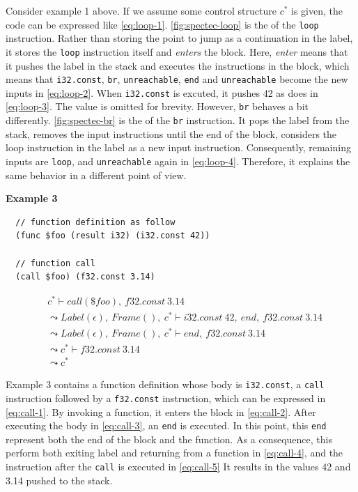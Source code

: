 Consider example 1 above.
If we assume some control structure $c^*$ is given, the code can be expressed
like \cref{eq:loop-1}.
\cref{fig:spectec-loop} is the \spectecp{} of the \texttt{loop} instruction.
Rather than storing the point to jump as a continuation in the label, it stores
the \texttt{loop} instruction itself and \textit{enters} the block.
Here, \textit{enter} means that it pushes the label in the stack and executes
the instructions in the block, which means that \texttt{i32.const},
\texttt{br}, \texttt{unreachable}, \texttt{end} and \texttt{unreachable} become
the new inputs in \cref{eq:loop-2}.
When \texttt{i32.const} is excuted, it pushes 42 as \officialp{} does
in \cref{eq:loop-3}.
The value is omitted for brevity.
However, \texttt{br} behaves a bit differently.
\cref{fig:spectec-br} is the \spectecp{} of the \texttt{br} instruction.
It pops the label from the stack, removes the input instructions until the end
of the block, considers the loop instruction in the label as a new input
instruction.
Consequently, remaining inputs are \texttt{loop}, and \texttt{unreachable}
again in \cref{eq:loop-4}.
Therefore, it explains the same behavior in a different point of view.


\textbf{Example 3}
\begin{verbatim}
  // function definition as follow
  (func $foo (result i32) (i32.const 42))

  // function call
  (call $foo) (f32.const 3.14)
\end{verbatim}

\begin{align}
  &c^* \vdash call(\$foo), ~ f32.const ~ 3.14 \label{eq:call-1} \\
&\leadsto
  Label(\epsilon), ~ Frame(), ~ c^* \vdash i32.const ~ 42, ~ end, ~ f32.const ~ 3.14 \label{eq:call-2} \\
&\leadsto
  Label(\epsilon), ~ Frame(), ~ c^* \vdash end, ~ f32.const ~ 3.14 \label{eq:call-3} \\
&\leadsto
  c^* \vdash f32.const ~ 3.14 \label{eq:call-4} \\
&\leadsto
  c^* \label{eq:call-5}
\end{align}

Example 3 contains a function definition whose body is \texttt{i32.const}, a
\texttt{call} instruction followed by a \texttt{f32.const} instruction, which
can be expressed in \cref{eq:call-1}.
By invoking a function, it enters the block in \cref{eq:call-2}.
After executing the body in \cref{eq:call-3}, an \texttt{end} is executed.
In this point, this \texttt{end} represent both the end of the block and the
function.
As a consequence, this  perform both exiting label and returning from
a function in \cref{eq:call-4}, and the instruction after the \texttt{call} is
executed in \cref{eq:call-5}
It results in the values 42 and 3.14 pushed to the stack.


